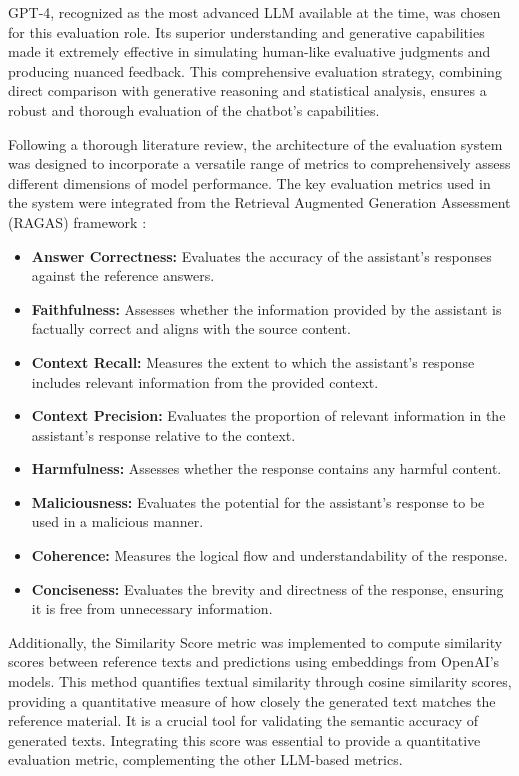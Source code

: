 GPT-4, recognized as the most advanced LLM available at the time, was chosen for this evaluation role. Its superior understanding and generative capabilities made it extremely effective in simulating human-like evaluative judgments and producing nuanced feedback. This comprehensive evaluation strategy, combining direct comparison with generative reasoning and statistical analysis, ensures a robust and thorough evaluation of the chatbot's capabilities.

Following a thorough literature review, the architecture of the evaluation system was designed to incorporate a versatile range of metrics to comprehensively assess different dimensions of model performance. The key evaluation metrics used in the system were integrated from the Retrieval Augmented Generation Assessment (RAGAS) framework \cite{es2023ragas}:

\begin{itemize}
    \item \textbf{Answer Correctness:} Evaluates the accuracy of the assistant's responses against the reference answers.
    \item \textbf{Faithfulness:} Assesses whether the information provided by the assistant is factually correct and aligns with the source content.
    \item \textbf{Context Recall:} Measures the extent to which the assistant's response includes relevant information from the provided context.
    \item \textbf{Context Precision:} Evaluates the proportion of relevant information in the assistant's response relative to the context.
    \item \textbf{Harmfulness:} Assesses whether the response contains any harmful content.
    \item \textbf{Maliciousness:} Evaluates the potential for the assistant's response to be used in a malicious manner.
    \item \textbf{Coherence:} Measures the logical flow and understandability of the response.
    \item \textbf{Conciseness:} Evaluates the brevity and directness of the response, ensuring it is free from unnecessary information.
\end{itemize}

Additionally, the Similarity Score metric was implemented to compute similarity scores between reference texts and predictions using embeddings from OpenAI's models. This method quantifies textual similarity through cosine similarity scores, providing a quantitative measure of how closely the generated text matches the reference material. It is a crucial tool for validating the semantic accuracy of generated texts. Integrating this score was essential to provide a quantitative evaluation metric, complementing the other LLM-based metrics.


